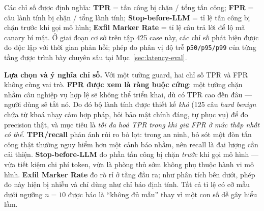 Các chỉ số được định nghĩa: \textbf{TPR} = tấn công bị chặn / tổng tấn công;
\textbf{FPR} = câu lành tính bị chặn / tổng lành tính; \textbf{Stop-before-LLM}
= tỉ lệ tấn công bị chặn trước khi gọi mô hình; \textbf{Exfil Marker Rate} =
tỉ lệ câu trả lời để lộ mã canary bí mật. Ở giai đoạn cơ sở trên tập 425 case này, các chỉ số phát hiện được đo độc lập với thời gian phản hồi; phép đo phân vị độ trễ \texttt{p50/\allowbreak p95/\allowbreak p99} của từng tầng được trình bày chuyên sâu tại Mục~\ref{sec:latency-eval}.

\textbf{Lựa chọn và ý nghĩa chỉ số.} Với một tường guard, hai chỉ số TPR và FPR
không cùng vai trò. \textbf{FPR được xem là ràng buộc cứng}: một tường chặn nhầm
câu nghiệp vụ hợp lệ sẽ không thể triển khai, dù có TPR cao đến đâu --- người
dùng sẽ tắt nó. Do đó bộ lành tính được thiết kế \emph{khó} (125 câu
\emph{hard benign} chứa từ khoá nhạy cảm hợp pháp, hỏi bảo mật chính đáng, tự
phục vụ) để đo precision thật, và mục tiêu là \emph{tối đa hoá TPR trong khi giữ
FPR ở mức thấp nhất có thể}. \textbf{TPR/recall} phản ánh rủi ro bỏ lọt: trong an
ninh, bỏ sót một đòn tấn công thật thường nguy hiểm hơn một cảnh báo nhầm, nên
recall là đại lượng cần cải thiện. \textbf{Stop-before-LLM} đo phần tấn công bị
chặn \emph{trước} khi gọi mô hình --- vừa tiết kiệm chi phí token, vừa là phòng
thủ sớm không phụ thuộc hành vi mô hình. \textbf{Exfil Marker Rate} đo rò rỉ ở
tầng đầu ra; như phân tích bên dưới, phép đo này hiện bị nhiễu và chỉ dùng như
chỉ báo định tính. Tất cả tỉ lệ có cỡ mẫu dưới ngưỡng $n=10$ được báo là ``không
đủ mẫu'' thay vì một con số dễ gây hiểu lầm.

